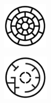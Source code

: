 \documentclass{article}\usepackage[]{graphicx}\usepackage[]{color}
\begin{document}
 \begin{figure}[h]
 \centering
 \begin{subfigure}{0.3\textwidth}
 \centering
 \includegraphics[width=0.9\linewidth]{imag/cu_des}
 \end{subfigure}
 \begin{subfigure}{0.3\textwidth}
 \centering
 \includegraphics[width=0.9\linewidth]{imag/planos}
 \end{subfigure}
 \end{figure}
\clearpage
\end{document}
